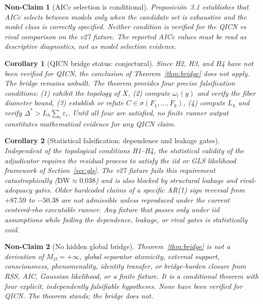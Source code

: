 \documentclass[11pt]{article}
\newtheorem{corollary}{Corollary}
\newtheorem{nonclaim}{Non-Claim}
\begin{document}
\begin{nonclaim}[AICc selection is conditional]
Proposici\'on~3.1 establishes that AICc selects between models only when the candidate set is exhaustive and the model class is correctly specified. Neither condition is verified for the QICN vs rival comparison on the v27 fixture. The reported AICc values must be read as descriptive diagnostics, not as model selection evidence.
\end{nonclaim}

\begin{corollary}[QICN bridge status: conjectural]
Since H2, H3, and H4 have not been verified for QICN, the conclusion of Theorem~\ref{thm:bridge} does not apply. The bridge remains unbuilt. The theorem provides four precise falsification conditions: (1) exhibit the topology of $X$, (2) compute $\omega_i(y)$ and verify the fiber diameter bound, (3) establish or refute $C\in\sigma(F_1,\ldots,F_k)$, (4) compute $L_h$ and verify $\Delta^{*}>L_h\sum_i\varepsilon_i$. Until all four are satisfied, no finite runner output constitutes mathematical evidence for any QICN claim.
\end{corollary}

\begin{corollary}[Statistical falsification: dependence and leakage gates]
Independent of the topological conditions H1--H4, the statistical validity of the adjudicator requires the residual process to satisfy the iid or GLS likelihood framework of Section~\ref{sec:gls}. The v27 fixture fails this requirement catastrophically ($\mathrm{DW}\approx0.038$) and is also blocked by structural leakage and rival-adequacy gates. Older hardcoded claims of a specific AR(1) sign reversal from $+87.59$ to $-50.38$ are not admissible unless reproduced under the current centered-rho executable runner. Any fixture that passes only under iid assumptions while failing the dependence, leakage, or rival gates is statistically void.
\end{corollary}

\begin{nonclaim}[No hidden global bridge]
Theorem~\ref{thm:bridge} is not a derivation of $M_{\Omega}=+\infty$, global separator atomicity, external support, consciousness, phenomenality, identity transfer, or bridge-burden closure from RSS, AIC, Gaussian likelihood, or a finite fixture. It is a conditional theorem with four explicit, independently falsifiable hypotheses. None have been verified for QICN. The theorem stands; the bridge does not.
\end{nonclaim}
\end{document}
